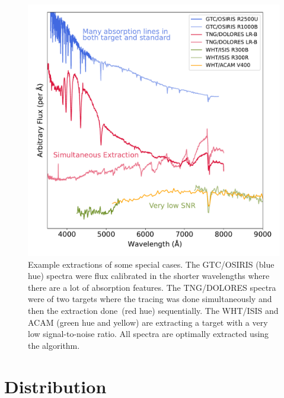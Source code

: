 \documentclass[linenumbers, twocolumn]{aastex631}
\begin{document}
\begin{figure}
    \centering
    \includegraphics[width=\textwidth]{fig_09_use_case_plots.pdf}
    \caption{Example extractions of some special cases. The GTC/OSIRIS (blue hue)
    spectra were flux calibrated in the shorter wavelengths where there are a lot
    of absorption features. The TNG/DOLORES spectra were of two targets where the
    tracing was done simultaneously and then the extraction done~(red hue)
    sequentially. The WHT/ISIS and ACAM (green hue and yellow) are extracting a
    target with a very low signal-to-noise ratio. All spectra are optimally extracted using the \citet{1986PASP...98..609H} algorithm.}
    \label{fig:use_cases}
\end{figure}

\section{Distribution}
\label{sec:distribution}
\end{document}
